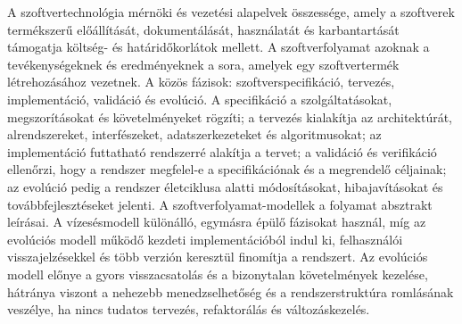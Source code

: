 \begin{summarybox}
A szoftvertechnológia mérnöki és vezetési alapelvek összessége, amely a szoftverek termékszerű előállítását, dokumentálását, használatát és karbantartását támogatja költség- és határidőkorlátok mellett. A szoftverfolyamat azoknak a tevékenységeknek és eredményeknek a sora, amelyek egy szoftvertermék létrehozásához vezetnek. A közös fázisok: szoftverspecifikáció, tervezés, implementáció, validáció és evolúció. A specifikáció a szolgáltatásokat, megszorításokat és követelményeket rögzíti; a tervezés kialakítja az architektúrát, alrendszereket, interfészeket, adatszerkezeteket és algoritmusokat; az implementáció futtatható rendszerré alakítja a tervet; a validáció és verifikáció ellenőrzi, hogy a rendszer megfelel-e a specifikációnak és a megrendelő céljainak; az evolúció pedig a rendszer életciklusa alatti módosításokat, hibajavításokat és továbbfejlesztéseket jelenti. A szoftverfolyamat-modellek a folyamat absztrakt leírásai. A vízesésmodell különálló, egymásra épülő fázisokat használ, míg az evolúciós modell működő kezdeti implementációból indul ki, felhasználói visszajelzésekkel és több verzión keresztül finomítja a rendszert. Az evolúciós modell előnye a gyors visszacsatolás és a bizonytalan követelmények kezelése, hátránya viszont a nehezebb menedzselhetőség és a rendszerstruktúra romlásának veszélye, ha nincs tudatos tervezés, refaktorálás és változáskezelés.
\end{summarybox}
